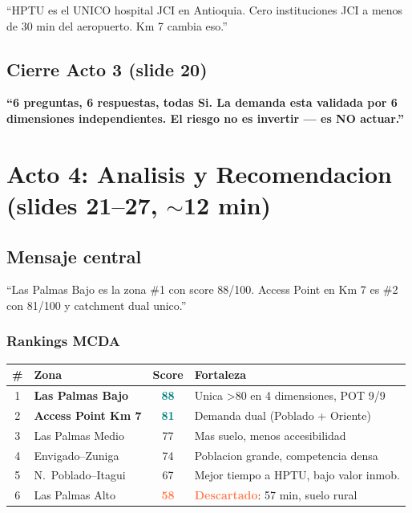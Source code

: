 \documentclass[11pt, a4paper]{article}
\newcommand{\hl}[1]{\textcolor{teal}{\textbf{#1}}}
\newcommand{\dg}[1]{\textcolor{coral}{\textbf{#1}}}
\begin{document}
\begin{cita}
``HPTU es el UNICO hospital JCI en Antioquia. Cero instituciones JCI a menos de 30 min del aeropuerto. Km 7 cambia eso.''
\end{cita}

\subsection{Cierre Acto 3 (slide 20)}

\begin{cita}
\textbf{``6 preguntas, 6 respuestas, todas Si. La demanda esta validada por 6 dimensiones independientes. El riesgo no es invertir --- es NO actuar.''}
\end{cita}

\section{Acto 4: Analisis y Recomendacion (slides 21--27, $\sim$12 min)}

\subsection{Mensaje central}

\begin{cita}
``Las Palmas Bajo es la zona \#1 con score 88/100. Access Point en Km 7 es \#2 con 81/100 y catchment dual unico.''
\end{cita}

\subsubsection{Rankings MCDA}

\begin{tabular}{@{}c l c l@{}}
\toprule
\textbf{\#} & \textbf{Zona} & \textbf{Score} & \textbf{Fortaleza} \\
\midrule
\rowcolor{bglight}
1 & \textbf{Las Palmas Bajo} & \hl{88} & Unica >80 en 4 dimensiones, POT 9/9 \\
2 & \textbf{Access Point Km 7} & \hl{81} & Demanda dual (Poblado + Oriente) \\
\rowcolor{bglight}
3 & Las Palmas Medio & 77 & Mas suelo, menos accesibilidad \\
4 & Envigado--Zuniga & 74 & Poblacion grande, competencia densa \\
\rowcolor{bglight}
5 & N.\ Poblado--Itagui & 67 & Mejor tiempo a HPTU, bajo valor inmob. \\
6 & Las Palmas Alto & \dg{58} & \dg{Descartado}: 57 min, suelo rural \\
\bottomrule
\end{tabular}
\end{document}
